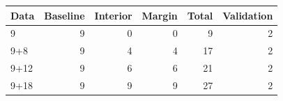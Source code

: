 \begin{tabular}{lrrrr|r}
\toprule
Data & Baseline & Interior & Margin & Total & Validation \\
\midrule
9 & 9 & 0 & 0 & 9 & 2 \\
9+8 & 9 & 4 & 4 & 17 & 2 \\
9+12 & 9 & 6 & 6 & 21 & 2 \\
9+18 & 9 & 9 & 9 & 27 & 2 \\
\bottomrule
\end{tabular}
